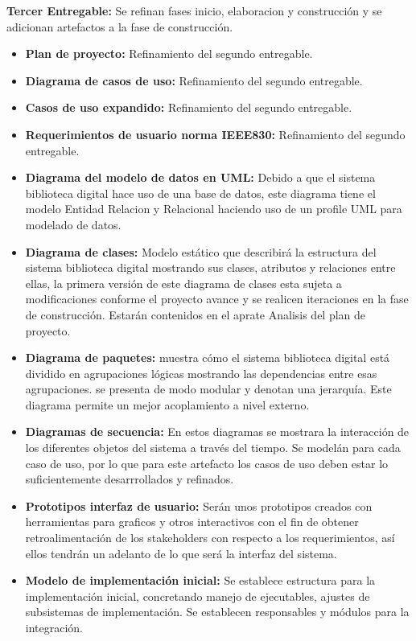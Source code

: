 \documentclass[]{article}
\begin{document}
		\textbf{Tercer Entregable:} Se refinan fases inicio, elaboracion y construcción y se
		adicionan artefactos a la fase de construcción.
		
		\begin{itemize}
		\item\textbf{Plan de proyecto:} Refinamiento del segundo entregable.

		\item\textbf{Diagrama de casos de uso:} Refinamiento del segundo entregable.

		\item\textbf{Casos de uso expandido:} Refinamiento del segundo entregable. 

		\item\textbf{Requerimientos de usuario norma IEEE830:} Refinamiento del segundo
		entregable.

		\item\textbf{Diagrama del modelo de datos en UML:} Debido a que el sistema biblioteca
		digital hace uso de una base de datos, este diagrama tiene el modelo Entidad Relacion y
		Relacional haciendo uso de un profile UML para modelado de datos.

		\item\textbf{Diagrama de clases:} Modelo estático que describirá la estructura del
		sistema biblioteca digital mostrando sus clases, atributos y relaciones entre ellas, la
		primera versión de este diagrama de clases esta sujeta a modificaciones conforme el proyecto
		avance y se realicen iteraciones en la fase de construcción. Estarán contenidos en el aprate
		Analisis del plan de proyecto.

		\item\textbf{Diagrama de paquetes:} muestra cómo el sistema biblioteca digital está
		dividido en agrupaciones lógicas mostrando las dependencias entre esas agrupaciones. se
		presenta de modo modular y denotan una jerarquía. Este diagrama permite un mejor acoplamiento
		a nivel externo.

		\item\textbf{Diagramas de secuencia:} En estos diagramas se mostrara la interacción de
		los diferentes objetos del sistema a través del tiempo. Se modelán para cada caso de uso, por
		lo que para este artefacto los casos de uso deben estar lo suficientemente desarrrollados y
		refinados.

		\item\textbf{Prototipos interfaz de usuario:} Serán unos prototipos creados con
		herramientas para graficos y otros interactivos con el fin de obtener retroalimentación de
		los stakeholders con respecto a los requerimientos, así ellos tendrán un adelanto de lo que
		será la interfaz del sistema.

		\item\textbf{Modelo de implementación inicial:} Se establece estructura para la
		implementación inicial, concretando manejo de ejecutables, ajustes de subsistemas de
		implementación. Se establecen responsables y módulos para la integración.
		\end{itemize}
		
\end{document}
